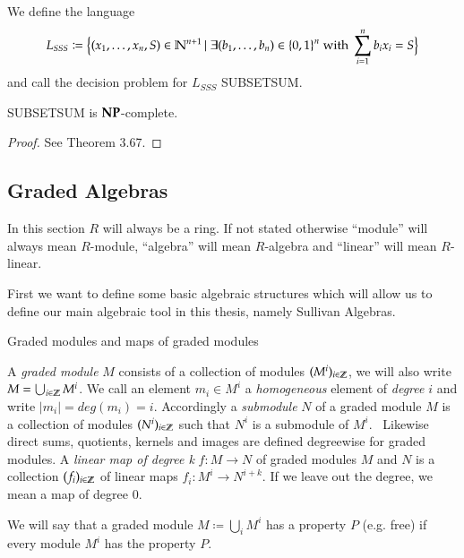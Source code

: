 \begin{Problem}
 We define the language
 $$ L_{SSS} \coloneqq {\big{\lbrace} (x_1, \ldots, x_n, S) \in \mathbb{N}^{n+1} \, | \;
 \exists (b_1, \ldots, b_n) \in {\lbrace 0,1 \rbrace}^n  \; \text{with} \; \sum_{i = 1}^n b_i x_i = S \big{\rbrace}} $$
 and call the decision problem for $L_{SSS}$ SUBSETSUM.
\end{Problem}

\begin{Theorem}
 SUBSETSUM is $\mathbf{NP}$-complete.
\end{Theorem}

\begin{proof}
 See \cite{JorgRothe2008} Theorem 3.67.
\end{proof}

 
 
\subsection{Graded Algebras}

In this section $R$ will always be a ring. If not stated otherwise ``module'' will
always mean $R$-module, ``algebra'' will mean $R$-algebra and ``linear'' will mean $R$-linear.

First we want to define some basic algebraic structures which will allow us to define our main algebraic tool
in this thesis, namely Sullivan Algebras.

\begin{Definition}{Graded modules and maps of graded modules}

A \emph{graded module} $M$ consists of a collection of modules $(M^i)_{i \in \mathbb{Z}}$, we will also write
$M = \bigcup_{i \in \mathbb{Z}} M^i$. We call an element 
$m_i \in M^i$ a \emph{homogeneous} element of \emph{degree} $i$ and write $|m_i| = deg (m_i) = i$. Accordingly a \emph{submodule} $N$ of
a graded module $M$ is a collection of modules $(N^i)_{i \in \mathbb{Z}}$ such that $N^i$ is a submodule of $M^i$. \
Likewise direct sums, quotients, kernels and images are defined degreewise for graded modules. \newline
A \emph{linear map of degree k} $f \colon M \to N$ of graded modules $M$ and $N$ is a collection $(f_i)_{i \in \mathbb{Z}}$ of
linear maps $f_i \colon M^i \to N^{i + k}$. If we leave out the degree, we mean a map of degree $0$.
\end{Definition}

We will say that a graded module $M \coloneqq \bigcup_i M^i$ has a property $P$ (e.g. free) if every module $M^i$ has the property $P$.
 
